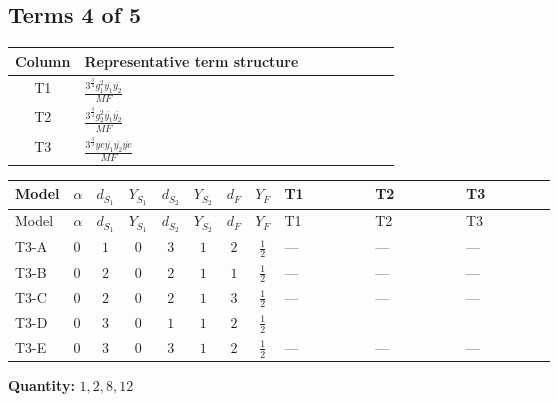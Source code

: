 \documentclass[8pt]{article}
\begin{document}
\begin{landscape}
\subsection*{Terms 4 of 5}
\begin{center}
\begin{tabular}{@{}c >{\raggedright\arraybackslash}p{0.82\linewidth}@{}}
\toprule
Column & Representative term structure \\
\midrule
T1 & \(\displaystyle \frac{3^{\frac{3}{4}} g_{1}^{2} \overline{y_{1}} \overline{y_{2}}}{MF}\) \\
\midrule
T2 & \(\displaystyle \frac{3^{\frac{3}{4}} g_{2}^{2} \overline{y_{1}} \overline{y_{2}}}{MF}\) \\
\midrule
T3 & \(\displaystyle \frac{3^{\frac{3}{4}} ye \overline{y_{1}} \overline{y_{2}} \overline{ye}}{MF}\) \\
\midrule
\bottomrule
\end{tabular}
\end{center}
\smallskip
\tiny
\begin{longtable}{@{}llcccccc >{\raggedright\arraybackslash}p{0.21\linewidth} >{\raggedright\arraybackslash}p{0.21\linewidth} >{\raggedright\arraybackslash}p{0.21\linewidth}@{}}
\toprule
Model & $\alpha$ & $d_{S_1}$ & $Y_{S_1}$ & $d_{S_2}$ & $Y_{S_2}$ & $d_F$ & $Y_F$ & T1 & T2 & T3 \\
\midrule
\endfirsthead
\toprule
Model & $\alpha$ & $d_{S_1}$ & $Y_{S_1}$ & $d_{S_2}$ & $Y_{S_2}$ & $d_F$ & $Y_F$ & T1 & T2 & T3 \\
\midrule
\endhead
T3-A & $0$ & $1$ & $0$ & $3$ & $1$ & $2$ & $\frac{1}{2}$ & --- & --- & --- \\
\midrule
T3-B & $0$ & $2$ & $0$ & $2$ & $1$ & $1$ & $\frac{1}{2}$ & --- & --- & --- \\
\midrule
T3-C & $0$ & $2$ & $0$ & $2$ & $1$ & $3$ & $\frac{1}{2}$ & --- & --- & --- \\
\midrule
T3-D & $0$ & $3$ & $0$ & $1$ & $1$ & $2$ & $\frac{1}{2}$ & \scriptsize\adjustbox{max width=\linewidth}{$\begin{gathered} \frac{3^{\frac{3}{4}} g_{1}^{2} \overline{y_{1}} \overline{y_{2}}}{8 MF}\end{gathered}$} & \scriptsize\adjustbox{max width=\linewidth}{$\begin{gathered} \frac{25 \cdot 3^{\frac{3}{4}} g_{2}^{2} \overline{y_{1}} \overline{y_{2}}}{24 MF}\end{gathered}$} & \scriptsize\adjustbox{max width=\linewidth}{$\begin{gathered} - \frac{3^{\frac{3}{4}} ye \overline{y_{1}} \overline{y_{2}} \overline{ye}}{12 MF}\end{gathered}$} \\
\midrule
T3-E & $0$ & $3$ & $0$ & $3$ & $1$ & $2$ & $\frac{1}{2}$ & --- & --- & --- \\
\midrule
\bottomrule
\end{longtable}
\clearpage
\noindent\textbf{Quantity: }$\mathrm{1,2,8,12}$\par\smallskip

\end{landscape}
\end{document}
